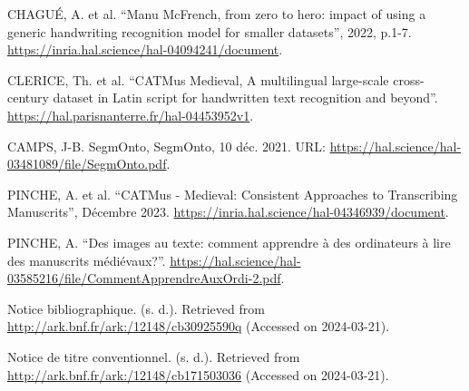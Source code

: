 \documentclass[12pt]{article}
\begin{document}

\begin{thebibliography}{9}
CHAGUÉ, A. et al. ``Manu McFrench, from zero to hero: impact of using a generic handwriting recognition model for smaller datasets'', 2022, p.1-7. \url{https://inria.hal.science/hal-04094241/document}.

CLERICE, Th. et al. ``CATMus Medieval, A multilingual large-scale cross-century dataset in Latin script for handwritten text recognition and beyond''. \url{https://hal.parisnanterre.fr/hal-04453952v1}.

CAMPS, J-B. SegmOnto, SegmOnto, 10 déc. 2021. URL: \url{https://hal.science/hal-03481089/file/SegmOnto.pdf}.

PINCHE, A. et al. ``CATMus - Medieval: Consistent Approaches to Transcribing Manuscrits'', Décembre 2023. \url{https://inria.hal.science/hal-04346939/document}.

PINCHE, A. ``Des images au texte: comment apprendre à des ordinateurs à lire des manuscrits médiévaux?''. \url{https://hal.science/hal-03585216/file/CommentApprendreAuxOrdi-2.pdf}.

Notice bibliographique. (s. d.). Retrieved from \url{http://ark.bnf.fr/ark:/12148/cb30925590q} (Accessed on 2024-03-21).

Notice de titre conventionnel. (s. d.). Retrieved from \url{http://ark.bnf.fr/ark:/12148/cb171503036} (Accessed on 2024-03-21).

\end{thebibliography}
\printglossary[type=\acronymtype]
\end{document}
